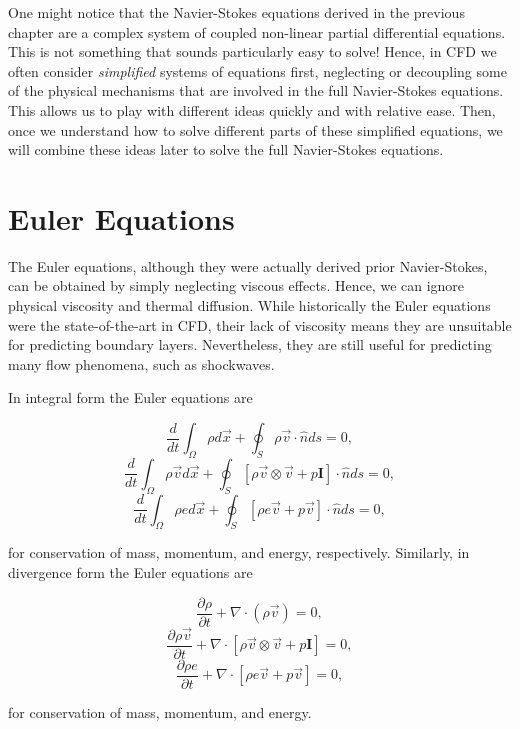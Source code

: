One might notice that the Navier-Stokes equations derived in the previous chapter are a complex system of coupled non-linear partial differential equations. This is not something that sounds particularly easy to solve! Hence, in CFD we often consider {\it simplified} systems of equations first, neglecting or decoupling some of the physical mechanisms that are involved in the full Navier-Stokes equations. This allows us to play with different ideas quickly and with relative ease. Then, once we understand how to solve different parts of these simplified equations, we will combine these ideas later to solve the full Navier-Stokes equations. 

\section{Euler Equations}
The Euler equations, although they were actually derived prior Navier-Stokes, can be obtained by simply neglecting viscous effects. Hence, we can ignore physical viscosity and thermal diffusion. While historically the Euler equations were the state-of-the-art in CFD, their lack of viscosity means they are unsuitable for predicting boundary layers. Nevertheless, they are still useful for predicting many flow phenomena, such as shockwaves.

In integral form the Euler equations are
\begin{eqBox}
\begin{equation}
	 \frac{d}{dt}\int_\Omega \rho d\vec{x} + \oint_S \rho \vec{v} \cdot \hat{n} ds = 0,
\end{equation}
\begin{equation}
	\frac{d}{dt}\int_\Omega \rho \vec{v} d\vec{x} + \oint_S \left[ \rho \vec{v} \otimes \vec{v} + p \mathbf{I} \right]\cdot \hat{n} ds =  0,
\end{equation}
\begin{equation}
	\frac{d}{dt}\int_\Omega \rho e d\vec{x} + \oint_S \left[ \rho e \vec{v} + p\vec{v} \right] \cdot \hat{n} ds = 0,
\end{equation}
\end{eqBox}
for conservation of mass, momentum, and energy, respectively. Similarly, in divergence form the Euler equations are
\begin{eqBox}
\begin{equation}
	 \frac{\partial \rho}{\partial t} + \nabla \cdot (\rho \vec{v}) = 0,
\end{equation}
\begin{equation}
	\frac{\partial \rho \vec{v}}{\partial t} + \nabla \cdot \left[ \rho \vec{v} \otimes \vec{v} + p \mathbf{I} \right] =  0,
\end{equation}
\begin{equation}
	\frac{\partial \rho e}{\partial t} + \nabla \cdot \left[ \rho e \vec{v} + p\vec{v} \right] = 0,
\end{equation}
\end{eqBox}
for conservation of mass, momentum, and energy.

